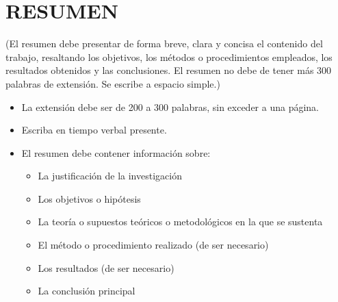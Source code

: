 \chapter*{RESUMEN}

(El resumen debe presentar de forma breve, clara y concisa el contenido del trabajo, resaltando los objetivos, los métodos o procedimientos empleados, los resultados obtenidos y las conclusiones. El resumen no debe de tener más 300 palabras de extensión. Se escribe a espacio simple.)

\begin{itemize}
	\item La extensión debe ser de 200 a 300 palabras, sin exceder a una página.
	\item Escriba en tiempo verbal presente.
	\item El resumen debe contener información sobre:
	\begin{itemize}
		\item La justificación de la investigación
		\item Los objetivos o hipótesis
		\item La teoría o supuestos teóricos o metodológicos en la que se sustenta
		\item El método o procedimiento realizado (de ser necesario)
		\item Los resultados (de ser necesario)
		\item La conclusión principal
	\end{itemize}
\end{itemize}

\clearpage